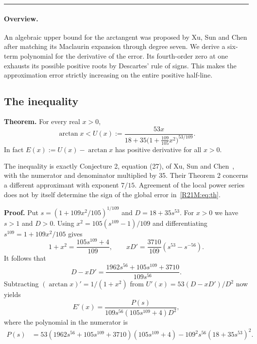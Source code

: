 \documentclass[11pt,a4paper]{article}
\begin{document}
\smallskip\hrule\medskip



\begingroup

\setcounter{equation}{0}
\renewcommand{\theequation}{\thesection.\arabic{equation}}
\renewcommand{\theHequation}{R21M.\arabic{equation}}
\paragraph{Overview.}
An algebraic upper bound for the arctangent was proposed by Xu, Sun and
Chen after matching its Maclaurin expansion through degree seven.
We derive a six-term polynomial for the derivative of the error.
Its fourth-order zero at one exhausts its possible positive roots by
Descartes' rule of signs. This makes the approximation error strictly
increasing on the entire positive half-line.


\subsection*{The inequality}
\textbf{Theorem.} For every real $x>0$,
\begin{equation}
  \arctan x< U(x):=
  \frac{53x}{18+35\bigl(1+\frac{109}{105}x^2\bigr)^{53/109}}.
  \label{R21M:eq:th}
\end{equation}
In fact $E(x):=U(x)-\arctan x$ has positive derivative for all $x>0$.

The inequality is exactly Conjecture 2, equation (27), of Xu, Sun and
Chen~\cite{R23M:XSC}, with the numerator and denominator multiplied by 35.
Their Theorem 2 concerns a different approximant with exponent $7/15$.
Agreement of the local power series does not by itself determine the sign
of the global error in~\eqref{R21M:eq:th}.

\textbf{Proof.} Put $s=(1+109x^2/105)^{1/109}$ and $D=18+35s^{53}$.
For $x>0$ we have $s>1$ and $D>0$. Using $x^2=105(s^{109}-1)/109$
and differentiating $s^{109}=1+109x^2/105$ gives
\[
  1+x^2=\frac{105s^{109}+4}{109},\qquad
  xD'=\frac{3710}{109}(s^{53}-s^{-56}).
\]
It follows that
\[
  D-xD'=\frac{1962s^{56}+105s^{109}+3710}{109s^{56}}.
\]
Subtracting $(\arctan x)'=1/(1+x^2)$ from
$U'(x)=53(D-xD')/D^2$ now yields
\begin{equation}
  E'(x)=\frac{P(s)}
  {109s^{56}(105s^{109}+4)D^2},\label{R21M:eq:der}
\end{equation}
where the polynomial in the numerator is
\begin{align*}
 P(s)&=53(1962s^{56}+105s^{109}+3710)(105s^{109}+4)
              -109^2s^{56}(18+35s^{53})^2.
\end{align*}
\end{document}
